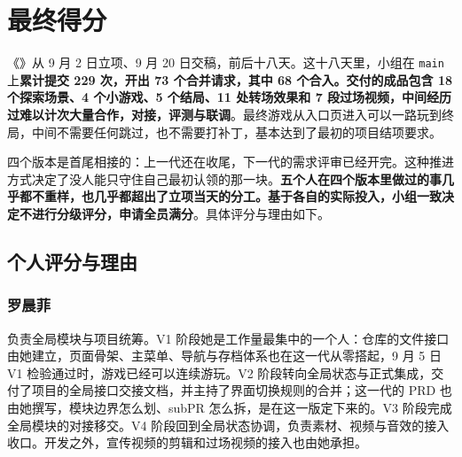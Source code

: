 %
%
%
%

\chapter{最终得分}

《\ProjectName》从 9 月 2 日立项、9 月 20 日交稿，前后十八天。这十八天里，小组在 \texttt{main} 上\textbf{累计提交 229 次，开出 73 个合并请求，其中 68 个合入。交付的成品包含 18 个探索场景、4 个小游戏、5 个结局、11 处转场效果和 7 段过场视频，中间经历过难以计次大量合作，对接，评测与联调}。最终游戏从入口页进入可以一路玩到终局，中间不需要任何跳过，也不需要打补丁，基本达到了最初的项目结项要求。

四个版本是首尾相接的：上一代还在收尾，下一代的需求评审已经开完。这种推进方式决定了没人能只守住自己最初认领的那一块。\textbf{五个人在四个版本里做过的事几乎都不重样，也几乎都超出了立项当天的分工。基于各自的实际投入，小组一致决定不进行分级评分，申请全员满分}。具体评分与理由如下。

\section{个人评分与理由}

\subsection{罗晨菲}

负责全局模块与项目统筹。V1 阶段她是工作量最集中的一个人：仓库的文件接口由她建立，页面骨架、主菜单、导航与存档体系也在这一代从零搭起，9 月 5 日 V1 检验通过时，游戏已经可以连续游玩。V2 阶段转向全局状态与正式集成，交付了项目的全局接口交接文档，并主持了界面切换规则的合并；这一代的 PRD 也由她撰写，模块边界怎么划、subPR 怎么拆，是在这一版定下来的。V3 阶段完成全局模块的对接移交。V4 阶段回到全局状态协调，负责素材、视频与音效的接入收口。开发之外，宣传视频的剪辑和过场视频的接入也由她承担。

